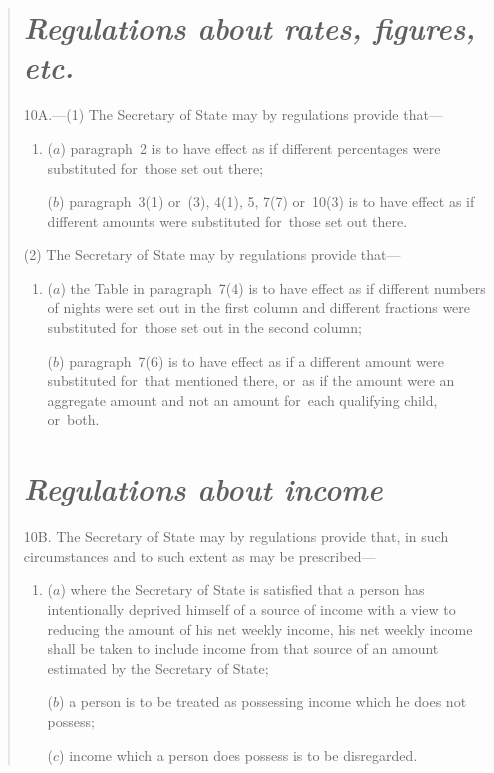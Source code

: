 \documentclass[12pt,a4paper]{article}
\begin{document}
\begin{quotation}
\section*{\itshape Regulations about rates, figures, etc.}

10A.---(1) The Secretary of State may by regulations provide that—
\begin{enumerate}\item[]
($a$) paragraph~2 is to have effect as if different percentages were substituted for~those set out there;

($b$) paragraph~3(1)  or~(3), 4(1), 5, 7(7)  or~10(3)  is to have effect as if different amounts were substituted for~those set out there.
\end{enumerate}

(2) The Secretary of State may by regulations provide that—
\begin{enumerate}\item[]
($a$) the Table in paragraph~7(4)  is to have effect as if different numbers of nights were set out in the first column and different fractions were substituted for~those set out in the second column;

($b$) paragraph~7(6)  is to have effect as if a different amount were substituted for~that mentioned there, or~as if the amount were an aggregate amount and not an amount for~each qualifying child, or~both.
\end{enumerate}

\section*{\itshape Regulations about income}

10B. The Secretary of State may by regulations provide that, in such circumstances and to such extent as may be prescribed—
\begin{enumerate}\item[]
($a$) where the Secretary of State is satisfied that a person has intentionally deprived himself of a source of income with a view to reducing the amount of his net weekly income, his net weekly income shall be taken to include income from that source of an amount estimated by the Secretary of State;

($b$) a person is to be treated as possessing income which he does not possess;

($c$) income which a person does possess is to be disregarded.
\end{enumerate}


\end{quotation}
\end{document}
